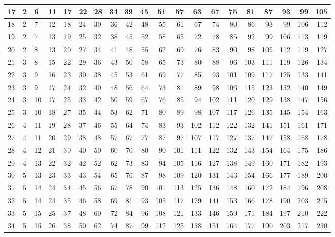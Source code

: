 \documentclass[
]{scrbook}
\begin{document}
\begin{tabular}{l|l|l|l|l|l|l|r|r|r|r|r|r|r|r|r|r|r|r|r}
\hline
17 & 2 & 6 & 11 & 17 & 22 & 28 & 34 & 39 & 45 & 51 & 57 & 63 & 67 & 75 & 81 & 87 & 93 & 99 & 105\\
\hline
18 & 2 & 7 & 12 & 18 & 24 & 30 & 36 & 42 & 48 & 55 & 61 & 67 & 74 & 80 & 86 & 93 & 99 & 106 & 112\\
\hline
19 & 2 & 7 & 13 & 19 & 25 & 32 & 38 & 45 & 52 & 58 & 65 & 72 & 78 & 85 & 92 & 99 & 106 & 113 & 119\\
\hline
20 & 2 & 8 & 13 & 20 & 27 & 34 & 41 & 48 & 55 & 62 & 69 & 76 & 83 & 90 & 98 & 105 & 112 & 119 & 127\\
\hline
21 & 3 & 8 & 15 & 22 & 29 & 36 & 43 & 50 & 58 & 65 & 73 & 80 & 88 & 96 & 103 & 111 & 119 & 126 & 134\\
\hline
22 & 3 & 9 & 16 & 23 & 30 & 38 & 45 & 53 & 61 & 69 & 77 & 85 & 93 & 101 & 109 & 117 & 125 & 133 & 141\\
\hline
23 & 3 & 9 & 17 & 24 & 32 & 40 & 48 & 56 & 64 & 73 & 81 & 89 & 98 & 106 & 115 & 123 & 132 & 140 & 149\\
\hline
24 & 3 & 10 & 17 & 25 & 33 & 42 & 50 & 59 & 67 & 76 & 85 & 94 & 102 & 111 & 120 & 129 & 138 & 147 & 156\\
\hline
25 & 3 & 10 & 18 & 27 & 35 & 44 & 53 & 62 & 71 & 80 & 89 & 98 & 107 & 117 & 126 & 135 & 145 & 154 & 163\\
\hline
26 & 4 & 11 & 19 & 28 & 37 & 46 & 55 & 64 & 74 & 83 & 93 & 102 & 112 & 122 & 132 & 141 & 151 & 161 & 171\\
\hline
27 & 4 & 11 & 20 & 29 & 38 & 48 & 57 & 67 & 77 & 87 & 97 & 107 & 117 & 127 & 137 & 147 & 158 & 168 & 178\\
\hline
28 & 4 & 12 & 21 & 30 & 40 & 50 & 60 & 70 & 80 & 90 & 101 & 111 & 122 & 132 & 143 & 154 & 164 & 175 & 186\\
\hline
29 & 4 & 13 & 22 & 32 & 42 & 52 & 62 & 73 & 83 & 94 & 105 & 116 & 127 & 138 & 149 & 160 & 171 & 182 & 193\\
\hline
30 & 5 & 13 & 23 & 33 & 43 & 54 & 65 & 76 & 87 & 98 & 109 & 120 & 131 & 143 & 154 & 166 & 177 & 189 & 200\\
\hline
31 & 5 & 14 & 24 & 34 & 45 & 56 & 67 & 78 & 90 & 101 & 113 & 125 & 136 & 148 & 160 & 172 & 184 & 196 & 208\\
\hline
32 & 5 & 14 & 24 & 35 & 46 & 58 & 69 & 81 & 93 & 105 & 117 & 129 & 141 & 153 & 166 & 178 & 190 & 203 & 215\\
\hline
33 & 5 & 15 & 25 & 37 & 48 & 60 & 72 & 84 & 96 & 108 & 121 & 133 & 146 & 159 & 171 & 184 & 197 & 210 & 222\\
\hline
34 & 5 & 15 & 26 & 38 & 50 & 62 & 74 & 87 & 99 & 112 & 125 & 138 & 151 & 164 & 177 & 190 & 203 & 217 & 230\\

\end{tabular}
\end{document}
